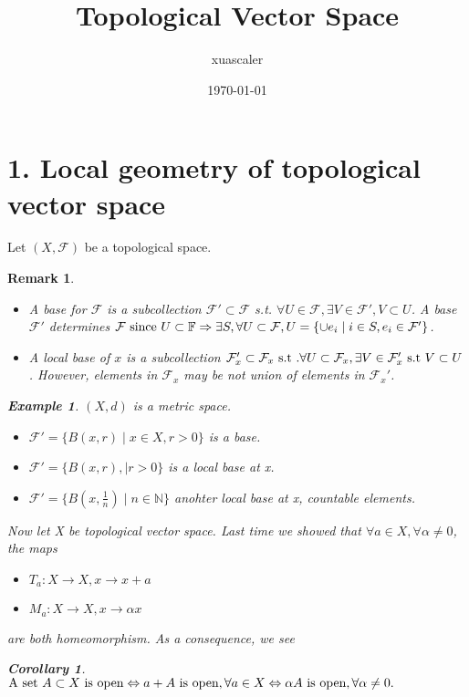 \documentclass{article}
\title{Topological Vector Space}
\author{xuascaler}
\date{\today}
\newtheorem*{remark}{Remark}
\newtheorem*{example}{Example}
\newtheorem*{corollary}{Corollary}
\begin{document}
\maketitle

\section*{1. Local geometry of topological vector space}
Let $(X, \mathcal{F})$ be a topological space.
\begin{remark} \hfill
  \begin{itemize}
    \item A base for $\mathcal{F}$ is a subcollection 
    $\mathcal{F}' \subset \mathcal{F}$ s.t. 
    $\forall U \in \mathcal{F}, \exists V \in \mathcal{F}', V \subset U$.
    A base 
    $
      \mathcal{F}'$ determines $\mathcal{F} \textnormal{ since } U \subset \mathbb{F} \Rightarrow
      \exists S, \forall U \subset \mathcal{F},
      U = \{\cup e_i \mid i \in S, e_i \in \mathcal{F}'\}
    $.
    \item  A local base of $x$ is a subcollection 
    $\mathcal{F}_x' \subset \mathcal{F}_x
    \textnormal{ s.t }. \forall U \subset \mathcal{F}_x, \exists V \in \mathcal{F}_x' \textnormal{ s.t } V \subset U$.
    However, elements in $\mathcal{F}_x$ may be not union of elements in $\mathcal{F}_x'$.
  \end{itemize}
  \begin{example}
    $(X, d)$ is a metric space.
    \begin{itemize}
      \item $\mathcal{F}' = \{B(x, r) \mid x \in X, r > 0\}$ is a base.
      \item $\mathcal{F}' = \{B(x, r), \mid r > 0\}$ is a local base at x.
      \item $\mathcal{F}' = \{B(x, \frac{1}{n}) \mid n \in \mathbb{N}\}$
      anohter local base at x, countable elements.
    \end{itemize}
  \end{example}
  Now let X be topological vector space. Last time we showed that 
  $\forall a \in X, \forall \alpha \neq 0$, the maps
  \begin{itemize}
    \item $T_a: X \rightarrow X, x \rightarrow x + a$
    \item $M_a: X \rightarrow X, x \rightarrow \alpha x$
  \end{itemize}
  are both homeomorphism. As a consequence, we see
  \begin{corollary}
    $
    \textnormal{A set }  A \subset X \textnormal{ is open} \Leftrightarrow
    a + A \textnormal{ is open}, \forall a \in X \Leftrightarrow
    \alpha A \textnormal{ is open}, \forall \alpha \neq 0.
    $ 
  \end{corollary}
\end{remark} 
\end{document}
